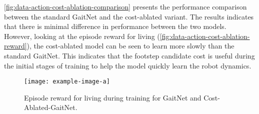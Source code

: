 \autoref{fig:data-action-cost-ablation-comparison} presents the
performance comparison between the standard GaitNet and the
cost-ablated variant. The results indicates that there is minimal
difference in performance between the two models. However, looking at
the episode reward for living
(\autoref{fig:data-action-cost-ablation-reward}), the cost-ablated
model can be seen to learn more slowly than the standard GaitNet.
This indicates that the footstep candidate cost is useful during the
initial stages of training to help the model quickly learn the robot dynamics.

\begin{figure}[H]
  \centering
  \texttt{[image: example-image-a]}
  \caption{Episode reward for living during training for GaitNet
  and Cost-Ablated-GaitNet.}
  \label{fig:data-action-cost-ablation-reward}
\end{figure}
